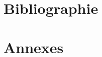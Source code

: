 \documentclass[a4paper]{article} %
\begin{document}

\section{Bibliographie}




\section{Annexes}




\end{document}
